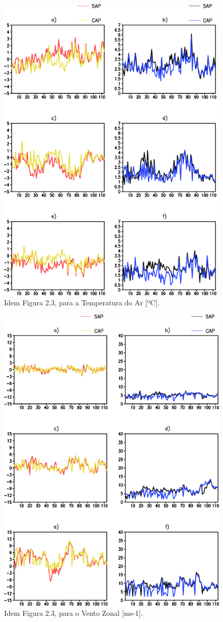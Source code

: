 \begin{figure}[!hbp]
\centering
\includegraphics[height=15cm]{./figs/vies_eqm-temp.png}
\caption{Idem Figura 2.3, para a Temperatura do Ar [ºC].}
\label{fig44}
\end{figure}

\begin{figure}[!hbp]
\centering
\includegraphics[height=15cm]{./figs/vies_eqm-uvel.png}
\caption{Idem Figura 2.3, para o Vento Zonal [ms-1].}
\label{fig45}
\end{figure}

